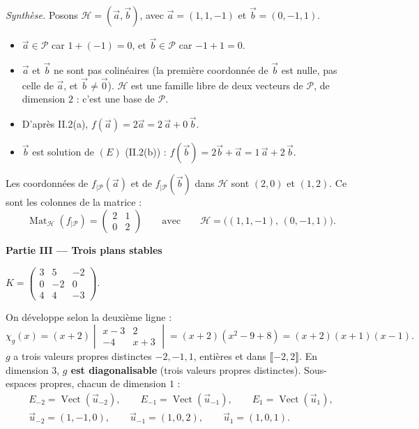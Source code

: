 \documentclass[a4paper,11pt]{article}
\numberwithin{equation}{section}
\numberwithin{figure}{section}
\numberwithin{table}{section}
\theoremstyle{enonce}
\theoremstyle{exemple}
\theoremstyle{remarque}
\newcommand{\vect}{\operatorname{Vect}}
\newcommand{\Mat}{\operatorname{Mat}}
\newcommand{\ient}[2]{\llbracket #1,#2\rrbracket}
\newcommand{\Partie}[1]{\par\needspace{5\baselineskip}\vspace{1.1em}\noindent
  {\sffamily\bfseries\large\color{Bleu}#1}\par\vspace{2pt}{\color{Filet}\rule{\linewidth}{0.4pt}}\par\smallskip}
\newcommand{\Q}[1]{\par\needspace{3\baselineskip}\medskip\noindent{\sffamily\bfseries\color{Bleu}#1}\enspace}
\begin{document}
\emph{Synthèse.} Posons $\mathcal H=(\vec a,\vec b)$, avec $\vec a=(1,1,-1)$ et $\vec b=(0,-1,1)$.
\begin{itemize}[leftmargin=1.2em,itemsep=2pt,topsep=2pt]
\item $\vec a\in\mathcal P$ car $1+(-1)=0$, et $\vec b\in\mathcal P$ car $-1+1=0$.
\item $\vec a$ et $\vec b$ ne sont pas colinéaires (la première coordonnée de $\vec b$ est nulle, pas celle de $\vec a$, et $\vec b\neq\vec 0$).
$\mathcal H$ est une famille libre de deux vecteurs de $\mathcal P$, de dimension $2$ : c'est une base de $\mathcal P$.
\item D'après II.2(a), $f(\vec a)=2\vec a=2\,\vec a+0\,\vec b$.
\item $\vec b$ est solution de $(E)$ (II.2(b)) : $f(\vec b)=2\vec b+\vec a=1\,\vec a+2\,\vec b$.
\end{itemize}
Les coordonnées de $f_{|\mathcal P}(\vec a)$ et de $f_{|\mathcal P}(\vec b)$ dans $\mathcal H$ sont $(2,0)$ et $(1,2)$. Ce sont les colonnes de la
matrice :
\[\boxed{\Mat_{\mathcal H}(f_{|\mathcal P})=\begin{pmatrix}2&1\\0&2\end{pmatrix}}\qquad\text{avec}\qquad \mathcal H=\big((1,1,-1),\,(0,-1,1)\big).\]

\Partie{Partie III — Trois plans stables}

$K=\begin{pmatrix}3&5&-2\\0&-2&0\\4&4&-3\end{pmatrix}$.

\Q{III.1} On développe selon la deuxième ligne :
\[\chi_g(x)=(x+2)\begin{vmatrix}x-3&2\\-4&x+3\end{vmatrix}=(x+2)(x^2-9+8)=(x+2)(x+1)(x-1).\]
$g$ a trois valeurs propres distinctes $-2,-1,1$, entières et dans $\ient{-2}{2}$. En dimension $3$, \textbf{$g$ est diagonalisable}
(trois valeurs propres distinctes). Sous-espaces propres, chacun de dimension $1$ :
\begin{gather*}E_{-2}=\vect(\vec u_{-2}),\qquad E_{-1}=\vect(\vec u_{-1}),\qquad E_1=\vect(\vec u_1),\\
\vec u_{-2}=(1,-1,0),\qquad \vec u_{-1}=(1,0,2),\qquad \vec u_1=(1,0,1).\end{gather*}
\end{document}
